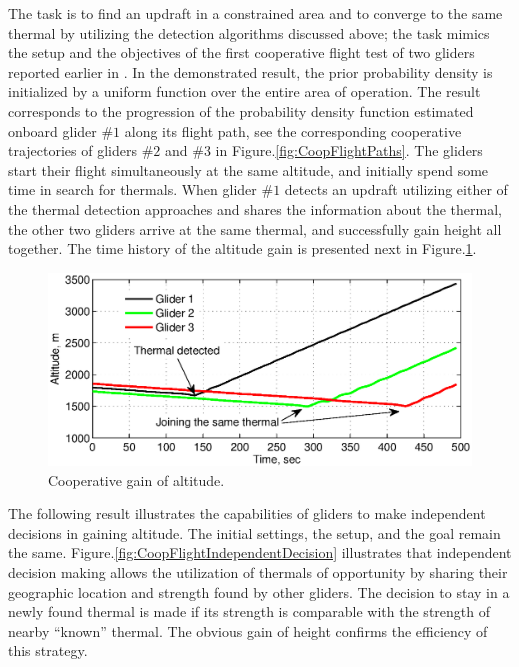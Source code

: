 \documentclass[letterpaper, 10 pt, conference]{ieeeconf}  %
\newcommand{\squeezeup}{\vspace{-1.0mm}}
\begin{document}
The task is to find an updraft in a constrained area and to converge to the same thermal by utilizing the detection algorithms discussed above; the task mimics the setup and the objectives of the first cooperative flight test of two gliders reported earlier in \cite{AKlass_JGCD:2012}. In the demonstrated
result, the prior probability density is initialized by a uniform function over the entire area of operation. The result corresponds to the progression of the probability density function estimated onboard glider $\#1$ along its flight path, see the corresponding cooperative trajectories of gliders
$\#2$ and $\#3$ in Figure.\ref{fig:CoopFlightPaths}. The gliders start their flight simultaneously at the same altitude, and initially spend some time in search for thermals. When glider $\#1$ detects an updraft utilizing either of the thermal detection approaches and shares the information about the thermal, the other two gliders arrive at the same thermal, and successfully gain height all together. The time history of the altitude gain is presented next in Figure.\ref{fig:CoopFlightHeight}.
\begin{figure}[thpb]
  \centering
  \includegraphics[scale=0.36]{Figures/Coop_gain_altitude.eps}
  \caption{Cooperative gain of altitude.}
  \label{fig:CoopFlightHeight}
\end{figure}
\squeezeup
The following result illustrates the capabilities of gliders to make independent decisions in gaining altitude. The initial settings, the setup, and the goal remain the same. Figure.\ref{fig:CoopFlightIndependentDecision} illustrates that independent decision making allows the utilization of thermals of opportunity by sharing their geographic location and strength found by other gliders. The decision to stay in a newly found thermal is made if its strength is comparable with the strength of nearby ``known'' thermal. The obvious gain of height confirms the efficiency of this strategy.
\end{document}
